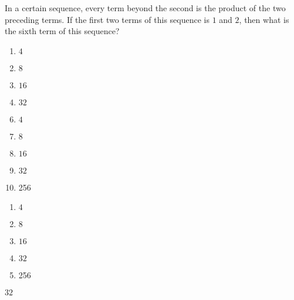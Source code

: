 

 In a certain sequence, every term beyond the second is the product of the two preceding terms.  If the first two terms of this sequence is $1$ and $2$, then what is the sixth term of this sequence?



\ifsat
	\begin{enumerate}[label=\Alph*)]
		\item   $4$
		\item  $8$
		\item  $16$
		\item  $32$%
	\end{enumerate}
\else
\fi

\ifacteven
	\begin{enumerate}[label=\textbf{\Alph*.},itemsep=\fill,align=left]
		\setcounter{enumii}{5}
		\item   $4$
		\item  $8$
		\item  $16$
		\addtocounter{enumii}{1}
		\item  $32$%
		\item  256
	\end{enumerate}
\else
\fi

\ifactodd
	\begin{enumerate}[label=\textbf{\Alph*.},itemsep=\fill,align=left]
		\item   $4$
		\item  $8$
		\item  $16$
		\item  $32$%
		\item  256
	\end{enumerate}
\else
\fi

\ifgridin
  $32$%

\else
\fi

